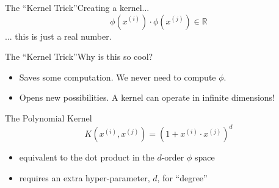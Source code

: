 \documentclass[xcolor=dvipsnames]{beamer}
\begin{document}
\begin{frame}{The ``Kernel Trick''}{Creating a kernel...}
    \vspace{1em}
    $$\phi(x^{(i)}) \cdotp \phi(x^{(j)}) \in \mathbb{R}$$
    ... this is just a real number.\\
    \vspace{3em}
\end{frame}

\begin{frame}{The ``Kernel Trick''}{Why is this so cool?}
    \begin{itemize}
        \item Saves some computation. We never need to compute $\phi$.
        \item Opens new possibilities. A kernel can operate in infinite dimensions!
    \end{itemize}
    \vspace{2em}
\end{frame}

\begin{frame}{The Polynomial Kernel}
    \vspace{1em}
    $$K(x^{(i)}, x^{(j)}) = (1 + x^{(i)} \cdotp x^{(j)})^d$$
    \begin{itemize}
        \item<2-> equivalent to the dot product in the $d$-order $\phi$ space
        \item<3-> requires an extra hyper-parameter, $d$, for ``degree''
    \end{itemize}
    \vspace{2em}
\end{frame}
\end{document}
